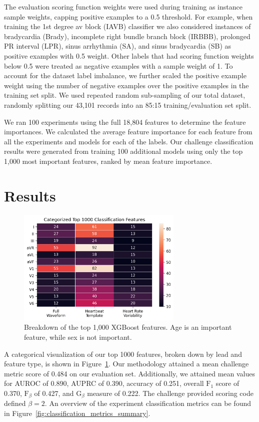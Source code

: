 \documentclass[twocolumn]{cinc}
\begin{document}
The evaluation scoring function weights were used during training as instance sample weights, capping positive examples to a 0.5 threshold.
For example, when training the 1st degree av block (IAVB) classifier we also considered instances of bradycardia (Brady), incomplete right bundle branch block (IRBBB), prolonged PR interval (LPR), sinus arrhythmia (SA), and sinus bradycardia (SB) as positive examples with 0.5 weight.
Other labels that had scoring function weights below 0.5 were treated as negative examples with a sample weight of 1.
To account for the dataset label imbalance, we further scaled the positive example weight using the number of negative examples over the positive examples in the training set split.
We used repeated random sub-sampling of our total dataset, randomly splitting our 43,101 records into an 85:15 training/evaluation set split.

We ran 100 experiments using the full 18,804 features to determine the feature importances.
We calculated the average feature importance for each feature from all the experiments and models for each of the labels.
Our challenge classification results were generated from training 100 additional models using only the top 1,000 most important features, ranked by mean feature importance.

\section{Results}

\begin{figure}[ht]
  \centering
  \includegraphics[width=7.9cm]{fig/top_features.png}
  \caption{Breakdown of the top 1,000 XGBoost features. Age is an important feature, while sex is not important.}
  \label{fig:top_features}
\end{figure}

A categorical visualization of our top 1000 features, broken down by lead and feature type, is shown in Figure~\ref{fig:top_features}.
Our methodology attained a mean challenge metric score of 0.484 on our evaluation set.
Additionally, we attained mean values for AUROC of 0.890, AUPRC of 0.390, accuracy of 0.251, overall $\text{F}_1$ score of 0.370, $\text{F}_\beta$ of 0.427, and $\text{G}_\beta$ measure of 0.222.
The challenge provided scoring code defined $\beta = 2$.
An overview of the experiment classification metrics can be found in Figure~\ref{fig:classification_metrics_summary}.
\end{document}
